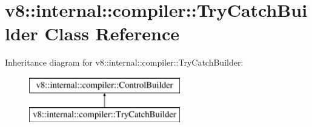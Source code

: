 \hypertarget{classv8_1_1internal_1_1compiler_1_1_try_catch_builder}{}\section{v8\+:\+:internal\+:\+:compiler\+:\+:Try\+Catch\+Builder Class Reference}
\label{classv8_1_1internal_1_1compiler_1_1_try_catch_builder}
Inheritance diagram for v8\+:\+:internal\+:\+:compiler\+:\+:Try\+Catch\+Builder\+:\begin{figure}[H]
\begin{center}
\leavevmode
\includegraphics[height=2.000000cm]{classv8_1_1internal_1_1compiler_1_1_try_catch_builder}
\end{center}
\end{figure}
